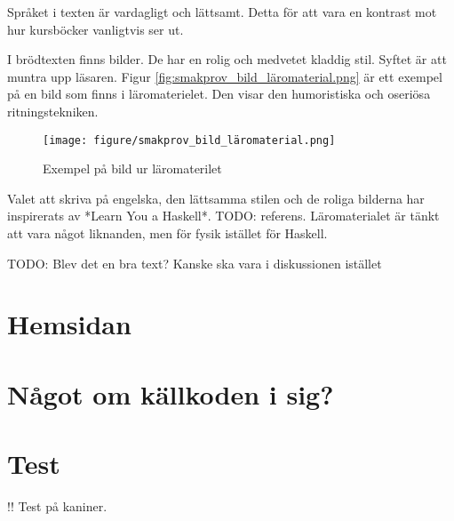 \begin{binge}
Språket i texten är vardagligt och lättsamt. Detta för att vara en kontrast mot hur kursböcker vanligtvis ser ut.

I brödtexten finns bilder. De har en rolig och medvetet kladdig stil. Syftet är att muntra upp läsaren. Figur \ref{fig:smakprov_bild_läromaterial.png} är ett exempel på en bild som finns i läromaterielet. Den visar den humoristiska och oseriösa ritningstekniken.

\begin{figure}
  \texttt{[image: figure/smakprov\_bild\_läromaterial.png]}
  \caption{Exempel på bild ur läromaterilet}
  \label{fig:smakprov_bild_läromaterial}
\end{figure}

Valet att skriva på engelska, den lättsamma stilen och de roliga bilderna har inspirerats av *Learn You a Haskell*. TODO: referens. Läromaterialet är tänkt att vara något liknanden, men för fysik istället för Haskell.

TODO: Blev det en bra text? Kanske ska vara i diskussionen istället

\section{Hemsidan}

\section{Något om källkoden i sig?}

\section{Test}

!! Test på kaniner.

\end{binge}
